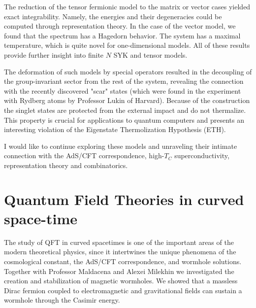 \documentclass[11pt]{article}
\begin{document}
The reduction of the tensor fermionic model to the matrix or vector cases yielded exact integrability. Namely, the energies and their degeneracies could be computed through representation theory. In the case of the vector model, we found that the spectrum has a Hagedorn behavior. The system has a maximal temperature, which is quite novel for one-dimensional models. All of these results provide further insight into finite $N$ SYK and tensor models. 


The deformation of such models by special operators resulted in the decoupling of the group-invariant sector from the rest of the system, revealing the connection with the recently discovered "scar" states (which were found in the experiment with Rydberg atoms by Professor Lukin of Harvard). Because of the construction the singlet states are protected from the external impact and do not thermalize.
This property is crucial for applications to quantum computers and presents an interesting violation of the Eigenstate Thermolization Hypothesis (ETH).



I would like to continue exploring these models and unraveling their intimate connection with the AdS/CFT correspondence, high-$T_C$ superconductivity,
representation theory and combinatorics. %


\section*{Quantum Field Theories in curved space-time}
The study of QFT in curved spacetimes is one of the important areas of the modern theoretical physics, since it intertwines the unique phenomena of the cosmological constant, the AdS/CFT correspondence, and wormhole solutions. Together with Professor Maldacena and Alexei Milekhin we investigated the creation and stabilization of magnetic wormholes. We showed that a massless Dirac fermion coupled to electromagnetic and gravitational fields can sustain a wormhole through the Casimir energy.  
\end{document}
